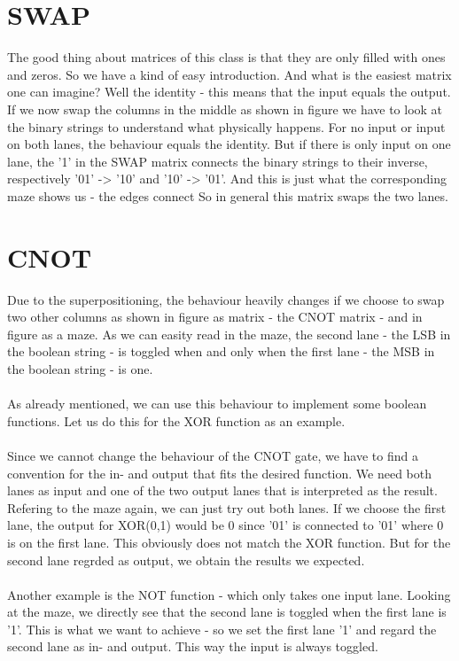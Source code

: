 \documentclass[oneside]{thesisclass}
\begin{document}
\section{SWAP}
The good thing about matrices of this class is that they are only filled with ones and zeros.
So we have a kind of easy introduction.
And what is the easiest matrix one can imagine?
Well the identity - this means that the input equals the output.
If we now swap the columns in the middle as shown in figure %
we have to look at the binary strings to understand what physically happens.
For no input or input on both lanes, the behaviour equals the identity.
But if there is only input on one lane, the '1' in the SWAP matrix connects the binary strings to their inverse, respectively '01' -> '10' and '10' -> '01'.
And this is just what the corresponding maze%
shows us - the edges connect%
So in general this matrix swaps the two lanes.

\section{CNOT}
Due to the superpositioning, the behaviour heavily changes if we choose to swap two other columns as shown in figure%
as matrix - the CNOT matrix - and in figure%
as a maze.
As we can easity read in the maze, the second lane - the LSB in the boolean string - is toggled when and only when the first lane - the MSB in the boolean string - is one.\\
\\As already mentioned, we can use this behaviour to implement some boolean functions.
Let us do this for the XOR function as an example.\\
\\Since we cannot change the behaviour of the CNOT gate, we have to find a convention for the in- and output that fits the desired function.
We need both lanes as input and one of the two output lanes that is interpreted as the result.
Refering to the maze again, we can just try out both lanes.
If we choose the first lane, the output for XOR(0,1) would be 0 since '01' is connected to '01' where 0 is on the first lane.
This obviously does not match the XOR function.
But for the second lane regrded as output, we obtain the results we expected.\\
\\Another example is the NOT function - which only takes one input lane.
Looking at the maze, we directly see that the second lane is toggled when the first lane is '1'.
This is what we want to achieve - so we set the first lane '1' and regard the second lane as in- and output.
This way the input is always toggled.
\end{document}
